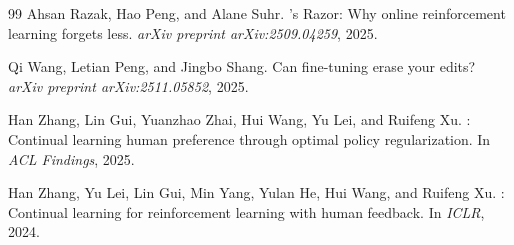 \documentclass{article}
\begin{document}
\begin{thebibliography}{99}
Ahsan Razak, Hao Peng, and Alane Suhr.
's Razor: Why online reinforcement learning forgets less.
\newblock \emph{arXiv preprint arXiv:2509.04259}, 2025.

Qi Wang, Letian Peng, and Jingbo Shang.
\newblock Can fine-tuning erase your edits?
\newblock \emph{arXiv preprint arXiv:2511.05852}, 2025.

Han Zhang, Lin Gui, Yuanzhao Zhai, Hui Wang, Yu Lei, and Ruifeng Xu.
: Continual learning human preference through optimal policy regularization.
\newblock In \emph{ACL Findings}, 2025.

Han Zhang, Yu Lei, Lin Gui, Min Yang, Yulan He, Hui Wang, and Ruifeng Xu.
: Continual learning for reinforcement learning with human feedback.
\newblock In \emph{ICLR}, 2024.

\end{thebibliography}
\end{document}
